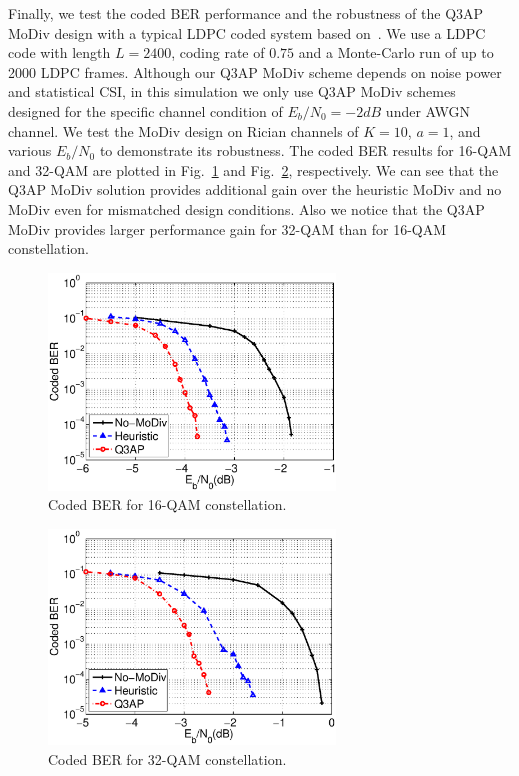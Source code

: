 \documentclass[journal]{IEEEtran}
\begin{document}
Finally, we test the coded BER performance and the robustness of the Q3AP MoDiv
design with a typical LDPC coded system based on~\cite{hochwald2003achieving}.
We use a LDPC code with length $L=2400$, coding rate of $0.75$ and a
Monte-Carlo run of up to 2000 LDPC frames. Although our Q3AP MoDiv scheme
depends on noise power and statistical CSI, in this simulation we only use Q3AP
MoDiv schemes designed for the specific channel condition of $E_b/N_0=-2dB$
under AWGN channel.
We test the MoDiv design on Rician channels of $K=10$, $a=1$, and various
$E_b/N_0$ to demonstrate its robustness. The coded BER results for 16-QAM and
32-QAM are plotted in Fig.~\ref{fig:coded_BER16QAM} and
Fig.~\ref{fig:coded_BER32QAM}, respectively. We can see that the Q3AP MoDiv
solution provides additional gain over the heuristic MoDiv and no MoDiv even for
mismatched design conditions. Also we notice that the Q3AP MoDiv provides larger
performance gain for 32-QAM than for 16-QAM constellation.

\begin{figure}[!t]
    \centering
    \includegraphics[width=3.0in]{./figs/coded_BER16QAM.eps}
    \caption{Coded BER for 16-QAM constellation.}
    \label{fig:coded_BER16QAM}
\end{figure}

\begin{figure}[!t]
    \centering
    \includegraphics[width=3.0in]{./figs/coded_BER32QAM.eps}
    \caption{Coded BER for 32-QAM constellation.}
    \label{fig:coded_BER32QAM}
\end{figure}
\end{document}
